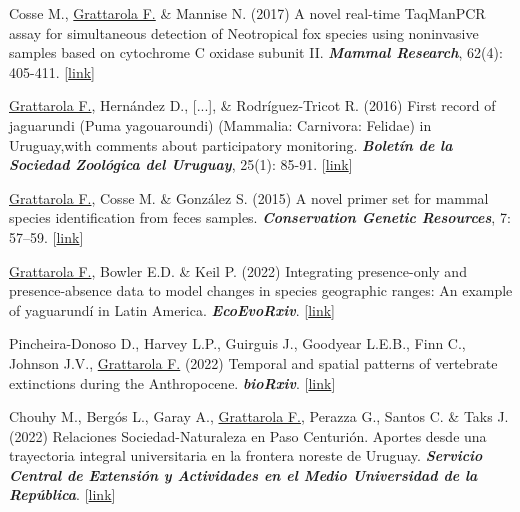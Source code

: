 \documentclass[9pt]{developercv} %
\begin{document}
\begin{etaremune}
\item Cosse M., \underline{Grattarola F.}  \& Mannise N. (2017) A novel real-time TaqMan\texttrademark PCR assay for simultaneous detection of Neotropical fox species using noninvasive samples based on cytochrome C oxidase subunit II. \textit{\textbf{Mammal Research}}, 62(4): 405-411. [\href{https://doi.org/10.1007/s13364-017-0328-y}{link}]

\item \underline{Grattarola F.}, Hernández D., [...], \& Rodríguez-Tricot R. (2016) First record of jaguarundi (Puma yagouaroundi) (Mammalia: Carnivora: Felidae) in Uruguay,with comments about  participatory monitoring. \textit{\textbf{Boletín de la Sociedad Zoológica del Uruguay}}, 25(1): 85-91. [\href{http://szu.org.uy/journal/index.php/Bol_SZU/article/view/23}{link}]

\item \underline{Grattarola F.}, Cosse M. \& González S. (2015) A novel primer set for mammal species identification from feces samples. \textit{\textbf{Conservation Genetic Resources}}, 7: 57–59. [\href{https://doi.org/10.1007/s12686-014-0359-5}{link}]

\end{etaremune}



\begin{etaremune}

\item \underline{Grattarola F.}, Bowler E.D. \& Keil P. (2022) Integrating presence-only and presence-absence data to model changes in species geographic ranges: An example of yaguarundí in Latin America. \textit{\textbf{EcoEvoRxiv}}. [\href{https://doi.org/10.32942/osf.io/67c4u}{link}]

\item Pincheira-Donoso D., Harvey L.P., Guirguis J., Goodyear L.E.B., Finn C., Johnson J.V., \underline{Grattarola F.} (2022) Temporal and spatial patterns of vertebrate extinctions during the Anthropocene. \textit{\textbf{bioRxiv}}. [\href{https://doi.org/10.1101/2022.05.05.490605}{link}]

\end{etaremune}


\begin{etaremune}

\item Chouhy M., Bergós L., Garay A., \underline{Grattarola F.}, Perazza G., Santos C. \& Taks J. (2022) Relaciones Sociedad-Naturaleza en Paso Centurión. Aportes desde una trayectoria integral universitaria en la frontera noreste de Uruguay. \textit{\textbf{Servicio Central de Extensión y Actividades en el Medio Universidad de la República}}. [\href{https://udelar.edu.uy/retema/wp-content/uploads/sites/30/2022/09/relaciones_sociedad-naturaleza_en_paso_centurion-comprimido-1.pdf}{link}]

\end{etaremune}
\end{document}
